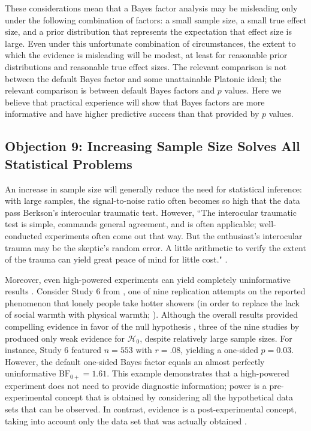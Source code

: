 These considerations mean that a Bayes factor analysis may be misleading only under the following combination of factors: a small sample size, a small true effect size, and a prior distribution that represents the expectation that effect size is large. Even under this unfortunate combination of circumstances, the extent to which the evidence is misleading will be modest, at least for reasonable prior distributions and reasonable true effect sizes. The relevant comparison is not between the default Bayes factor and some unattainable Platonic ideal; the relevant comparison is between default Bayes factors and $p$ values. Here we believe that practical experience will show that Bayes factors are more informative and have higher predictive success than that provided by $p$ values.

\subsection{Objection 9: Increasing Sample Size Solves All Statistical Problems}
An increase in sample size will generally reduce the need for statistical inference: with large samples, the signal-to-noise ratio often becomes so high that the data pass Berkson's interocular traumatic test. However, ``The interocular traumatic test is simple, commands general agreement, and is often applicable; well-conducted experiments often come out that way. But the enthusiast's interocular trauma may be the skeptic's random error. A little arithmetic to verify the extent of the trauma can yield great peace of mind for little cost." \cite[p. 217]{EdwardsEtAl1963}.

Moreover, even high-powered experiments can yield completely uninformative results \cite{WagenmakersEtAl2016Bathing}. Consider Study 6 from , one of nine replication attempts on the reported phenomenon that lonely people take hotter showers (in order to replace the lack of social warmth with physical warmth; ). Although the overall results provided compelling evidence in favor of the null hypothesis \cite{WagenmakersEtAl2016Bathing}, three of the nine studies by  produced only weak evidence for $\mathcal{H}_0$, despite relatively large sample sizes. For instance, Study 6 featured $n=553$ with $r=.08$, yielding a one-sided $p = 0.03$. However, the default one-sided Bayes factor equals an almost perfectly uninformative $\text{BF}_{0+} = 1.61$. This example demonstrates that a high-powered experiment does not need to provide diagnostic information; power is a pre-experimental concept that is obtained by considering all the hypothetical data sets that can be observed. In contrast, evidence is a post-experimental concept, taking into account only the data set that was actually obtained \cite{WagenmakersEtAlPowerFallacy2015}.

